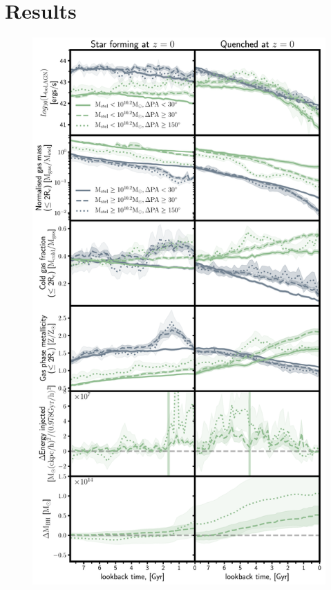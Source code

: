 \documentclass[fleqn,usenatbib]{mnras}
\begin{document}
\section{Results} \label{sec:results}
\begin{figure}
	\includegraphics[width=\linewidth]{overall_population/time_evo_letter.pdf}

\end{figure}
\end{document}
